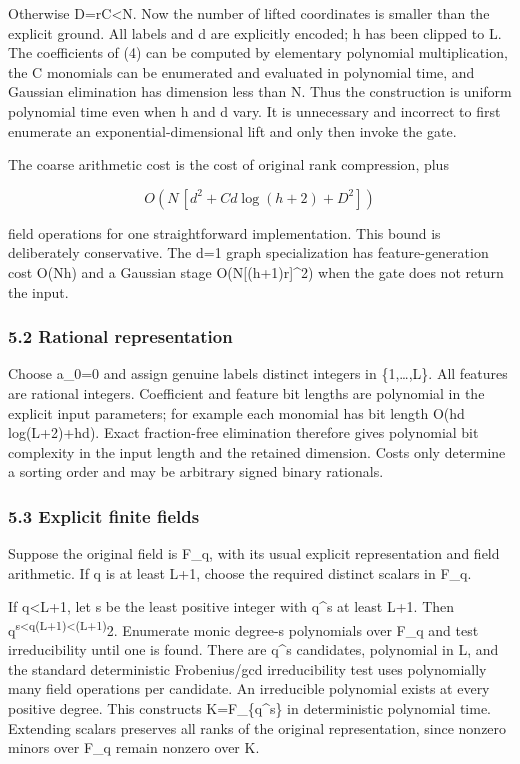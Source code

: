 Otherwise D=rC\textless N. Now the number of lifted coordinates is smaller than the explicit ground. All labels and d are explicitly encoded; h has been clipped to L. The coefficients of (4) can be computed by elementary polynomial multiplication, the C monomials can be enumerated and evaluated in polynomial time, and Gaussian elimination has dimension less than N. Thus the construction is uniform polynomial time even when h and d vary. It is unnecessary and incorrect to first enumerate an exponential-dimensional lift and only then invoke the gate.

The coarse arithmetic cost is the cost of original rank compression, plus

\[
O\!\left(N\,[d^2+C d\log(h+2)+D^2]\right)
 \tag{17}
\]

field operations for one straightforward implementation. This bound is deliberately conservative. The d=1 graph specialization has feature-generation cost O(Nh) and a Gaussian stage O(N{[}(h+1)r{]}\^{}2) when the gate does not return the input.

\hypertarget{af-7a1626f5ae-rational-representation}{%
\subsubsection{5.2 Rational representation}\label{af-7a1626f5ae-rational-representation}}

Choose a\_0=0 and assign genuine labels distinct integers in \{1,\ldots,L\}. All features are rational integers. Coefficient and feature bit lengths are polynomial in the explicit input parameters; for example each monomial has bit length O(hd log(L+2)+hd). Exact fraction-free elimination therefore gives polynomial bit complexity in the input length and the retained dimension. Costs only determine a sorting order and may be arbitrary signed binary rationals.

\hypertarget{af-7a1626f5ae-explicit-finite-fields}{%
\subsubsection{5.3 Explicit finite fields}\label{af-7a1626f5ae-explicit-finite-fields}}

Suppose the original field is F\_q, with its usual explicit representation and field arithmetic. If q is at least L+1, choose the required distinct scalars in F\_q.

If q\textless L+1, let s be the least positive integer with q\^{}s at least L+1. Then q\textsuperscript{s\textless q(L+1)\textless(L+1)}2. Enumerate monic degree-s polynomials over F\_q and test irreducibility until one is found. There are q\^{}s candidates, polynomial in L, and the standard deterministic Frobenius/gcd irreducibility test uses polynomially many field operations per candidate. An irreducible polynomial exists at every positive degree. This constructs K=F\_\{q\^{}s\} in deterministic polynomial time. Extending scalars preserves all ranks of the original representation, since nonzero minors over F\_q remain nonzero over K.

